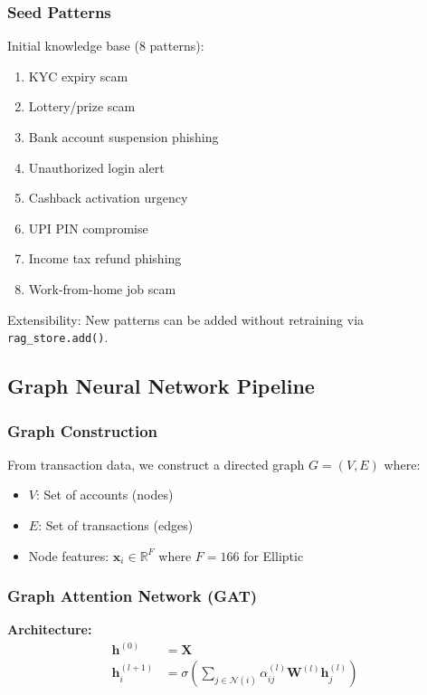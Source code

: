 \subsubsection{Seed Patterns}

Initial knowledge base (8 patterns):
\begin{enumerate}
    \item KYC expiry scam
    \item Lottery/prize scam
    \item Bank account suspension phishing
    \item Unauthorized login alert
    \item Cashback activation urgency
    \item UPI PIN compromise
    \item Income tax refund phishing
    \item Work-from-home job scam
\end{enumerate}

Extensibility: New patterns can be added without retraining via \texttt{rag\_store.add()}.
\subsection{Graph Neural Network Pipeline}

\subsubsection{Graph Construction}

From transaction data, we construct a directed graph $G = (V, E)$ where:
\begin{itemize}
    \item $V$: Set of accounts (nodes)
    \item $E$: Set of transactions (edges)
    \item Node features: $\mathbf{x}_i \in \mathbb{R}^{F}$ where $F=166$ for Elliptic
\end{itemize}

\subsubsection{Graph Attention Network (GAT)}

\textbf{Architecture:}
\begin{align}
\mathbf{h}^{(0)} &= \mathbf{X} \\
\mathbf{h}^{(l+1)}_i &= \sigma\left(\sum_{j \in \mathcal{N}(i)} \alpha_{ij}^{(l)} \mathbf{W}^{(l)} \mathbf{h}^{(l)}_j\right)
\end{align}

